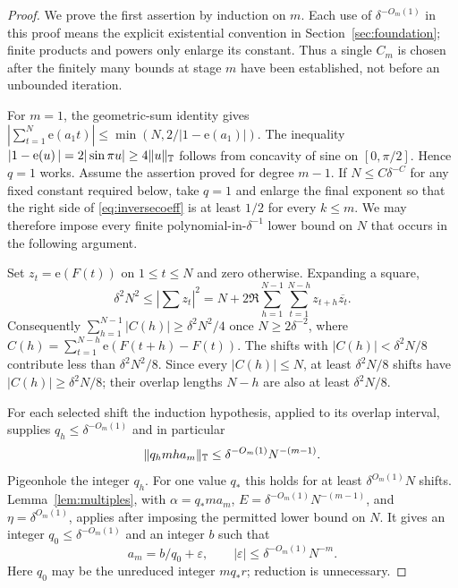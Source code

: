 \documentclass[11pt,oneside]{article}
\theoremstyle{definition}\newtheorem{definition}[theorem]{Definition}
\theoremstyle{remark}\newtheorem{remark}[theorem]{Remark}
\newcommand{\ee}[1]{\mathrm e\!\left(#1\right)}
\begin{document}
\begin{proof}
We prove the first assertion by induction on $m$. Each use of
$\delta^{-O_m(1)}$ in this proof means the explicit existential convention
in Section~\ref{sec:foundation}; finite products and powers only enlarge its
constant. Thus a single $C_m$ is chosen after the finitely many bounds at
stage $m$ have been established, not before an unbounded iteration.

For $m=1$, the geometric-sum identity gives
$|\sum_{t=1}^N\ee{a_1t}|\leq\min(N,2/|1-\ee{a_1}|)$.
The inequality $|1-\ee{u}|=2|\sin\pi u|\geq4\|u\|_\T$ follows from
concavity of sine on $[0,\pi/2]$. Hence $q=1$ works.
Assume the assertion proved for degree $m-1$. If
$N\leq C\delta^{-C}$ for any fixed constant required below, take $q=1$
and enlarge the final exponent so that the right side of
\eqref{eq:inversecoeff} is at least $1/2$ for every $k\leq m$.
We may therefore impose every finite polynomial-in-$\delta^{-1}$ lower bound
on $N$ that occurs in the following argument.

Set $z_t=\ee{F(t)}$ on $1\leq t\leq N$ and zero otherwise. Expanding a square,
\[
 \delta^2N^2\leq\left|\sum z_t\right|^2
 =N+2\Re\sum_{h=1}^{N-1}\sum_{t=1}^{N-h}z_{t+h}\overline{z_t}.
\]
Consequently $\sum_{h=1}^{N-1}|C(h)|\geq\delta^2N^2/4$ once
$N\geq2\delta^{-2}$, where $C(h)=\sum_{t=1}^{N-h}\ee{F(t+h)-F(t)}$.
The shifts with $|C(h)|<\delta^2N/8$ contribute less than
$\delta^2N^2/8$. Since every $|C(h)|\leq N$, at least
$\delta^2N/8$ shifts have $|C(h)|\geq\delta^2N/8$; their overlap lengths
$N-h$ are also at least $\delta^2N/8$.

For each selected shift the induction hypothesis, applied to its overlap
interval, supplies $q_h\leq\delta^{-O_m(1)}$ and in particular
\[
 \|q_h m h a_m\|_\mathbb T
       \leq\delta^{-O_m(1)}N^{-(m-1)}.
\]
Pigeonhole the integer $q_h$. For one value $q_*$ this holds for at least
$\delta^{O_m(1)}N$ shifts. Lemma~\ref{lem:multiples}, with
$\alpha=q_*ma_m$, $E=\delta^{-O_m(1)}N^{-(m-1)}$, and
$\eta=\delta^{O_m(1)}$, applies after imposing the permitted lower bound on
$N$. It gives an integer $q_0\leq\delta^{-O_m(1)}$ and an integer $b$ such that
\[
 a_m=b/q_0+\varepsilon,
 \qquad |\varepsilon|\leq\delta^{-O_m(1)}N^{-m}.
\]
Here $q_0$ may be the unreduced integer $m q_*r$; reduction is unnecessary.


\end{proof}
\end{document}
